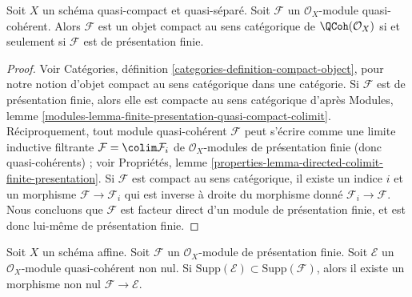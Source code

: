 \begin{lemma}
\label{lemma-categorically-compact-QCoh}
Soit $X$ un schéma quasi-compact et quasi-séparé.
Soit $\mathcal{F}$ un $\mathcal{O}_X$-module quasi-cohérent.
Alors $\mathcal{F}$ est un objet compact au sens catégorique de
$\QCoh(\mathcal{O}_X)$ si et seulement si $\mathcal{F}$ est de
présentation finie.
\end{lemma}

\begin{proof}
Voir Catégories, définition \ref{categories-definition-compact-object},
pour notre notion d'objet compact au sens catégorique dans une catégorie.
Si $\mathcal{F}$ est de présentation finie, alors elle est compacte au sens
catégorique d'après Modules, lemme
\ref{modules-lemma-finite-presentation-quasi-compact-colimit}.
Réciproquement, tout module quasi-cohérent $\mathcal{F}$ peut s'écrire
comme une limite inductive filtrante $\mathcal{F} = \colim \mathcal{F}_i$
de $\mathcal{O}_X$-modules de présentation finie (donc quasi-cohérents) ;
voir Propriétés, lemme
\ref{properties-lemma-directed-colimit-finite-presentation}.
Si $\mathcal{F}$ est compact au sens catégorique, il existe un indice $i$
et un morphisme $\mathcal{F} \to \mathcal{F}_i$ qui est inverse à droite du
morphisme donné $\mathcal{F}_i \to \mathcal{F}$.
Nous concluons que $\mathcal{F}$ est facteur direct d'un module de
présentation finie, et est donc lui-même de présentation finie.
\end{proof}

\begin{lemma}
\label{lemma-supported-on-support-pre}
Soit $X$ un schéma affine. Soit $\mathcal{F}$ un
$\mathcal{O}_X$-module de présentation finie. Soit $\mathcal{E}$ un
$\mathcal{O}_X$-module quasi-cohérent non nul. Si
$\text{Supp}(\mathcal{E}) \subset \text{Supp}(\mathcal{F})$,
alors il existe un morphisme non nul $\mathcal{F} \to \mathcal{E}$.
\end{lemma}

